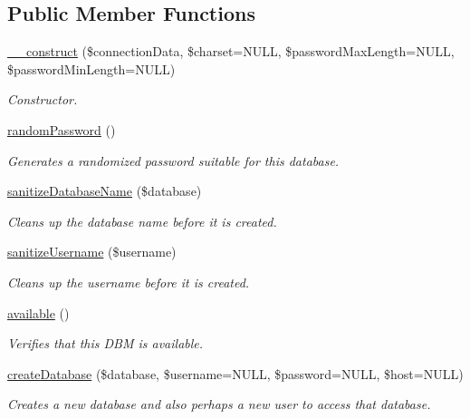 \subsection*{Public Member Functions}
\begin{DoxyCompactItemize}
\item 
\hyperlink{classGenericDBM_a7afb63278f732af26145ee715b86134d}{\-\_\-\-\_\-construct} (\$connection\-Data, \$charset=N\-U\-L\-L, \$password\-Max\-Length=N\-U\-L\-L, \$password\-Min\-Length=N\-U\-L\-L)
\begin{DoxyCompactList}\small\item\em Constructor. \end{DoxyCompactList}\item 
\hyperlink{classGenericDBM_a4cd49851039d573019ad0f025766297d}{random\-Password} ()
\begin{DoxyCompactList}\small\item\em Generates a randomized password suitable for this database. \end{DoxyCompactList}\item 
\hyperlink{classGenericDBM_a0fffdaea424473cad66b61d0e8fab06c}{sanitize\-Database\-Name} (\$database)
\begin{DoxyCompactList}\small\item\em Cleans up the database name before it is created. \end{DoxyCompactList}\item 
\hyperlink{classGenericDBM_abfda5d7c3be8438496507e538907d82d}{sanitize\-Username} (\$username)
\begin{DoxyCompactList}\small\item\em Cleans up the username before it is created. \end{DoxyCompactList}\item 
\hyperlink{interfaceDatabaseManagerInterface_a1bdc962627a768e26d780cd0a26e2743}{available} ()
\begin{DoxyCompactList}\small\item\em Verifies that this D\-B\-M is available. \end{DoxyCompactList}\item 
\hyperlink{interfaceDatabaseManagerInterface_a6082d67a8a02ffd538c5193adfa8f605}{create\-Database} (\$database, \$username=N\-U\-L\-L, \$password=N\-U\-L\-L, \$host=N\-U\-L\-L)
\begin{DoxyCompactList}\small\item\em Creates a new database and also perhaps a new user to access that database. \end{DoxyCompactList}\end{DoxyCompactItemize}
